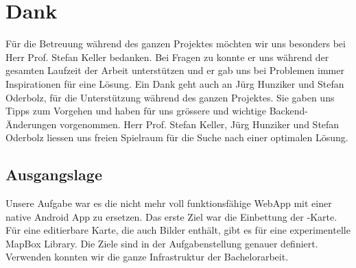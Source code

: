 \chapter*{Dank}
\thispagestyle{scrheadings}

Für die Betreuung während des ganzen Projektes möchten wir uns besonders bei Herr Prof. Stefan
Keller bedanken.
Bei Fragen zu  konnte er uns während der gesamten Laufzeit der Arbeit unterstützen und er gab uns bei Problemen immer Inspirationen für eine Lösung. 
Ein Dank geht auch an Jürg Hunziker und Stefan Oderbolz, für die Unterstützung während des ganzen Projektes.
Sie gaben uns Tipps zum Vorgehen und haben für uns grössere und wichtige Backend-Änderungen vorgenommen. 
Herr Prof. Stefan Keller, Jürg Hunziker und Stefan Oderbolz liessen uns freien Spielraum für die Suche nach einer optimalen Lösung.

\section*{Ausgangslage}
Unsere Aufgabe war es die nicht mehr voll funktionsfähige \gls{WebApp} mit einer native Android App zu ersetzen.
Das erste Ziel war die Einbettung der -Karte.
Für eine editierbare Karte, die auch Bilder enthält, gibt es für  eine experimentelle MapBox Library. 
Die Ziele sind in der Aufgabenstellung genauer definiert.
Verwenden konnten wir die ganze Infrastruktur der \kort{} Bachelorarbeit.


